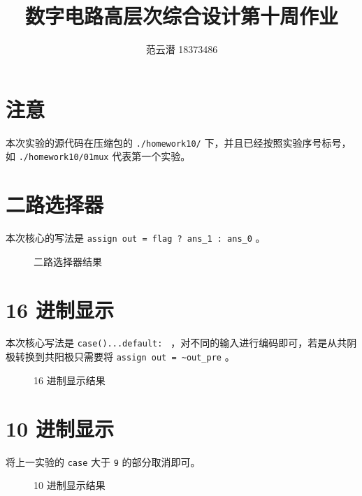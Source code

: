 \documentclass[lang=cn,11pt,a4paper,cite=authoryear]{elegantpaper}
\title{数字电路高层次综合设计\quad 第十周作业}
\author{范云潜 18373486}
\institute{微电子学院 184111 班}
\date{\zhtoday}
\begin{document}
\maketitle

\tableofcontents

\listoffigures

\section*{注意}

本次实验的源代码在压缩包的 \lstinline{./homework10/} 下，并且已经按照实验序号标号，如 \lstinline{./homework10/01mux} 代表第一个实验。

\section{二路选择器}

本次核心的写法是 \lstinline{assign out = flag ? ans_1 : ans_0} 。


\begin{figure}
    \centering
    \caption{二路选择器结果}\label{01} 
     \hfill 
\end{figure}

\section{16 进制显示}

本次核心写法是 \lstinline{case()...default: } ，对不同的输入进行编码即可，若是从共阴极转换到共阳极只需要将 \lstinline{assign out = ~out_pre} 。


\begin{figure}
    \centering
    \caption{16 进制显示结果}\label{02} 
     \hfill 
     \hfill 
     \hfill 
\end{figure}

\section{10 进制显示}

将上一实验的 \lstinline{case} 大于 \lstinline{9} 的部分取消即可。

\begin{figure}
    \centering
    \caption{10 进制显示结果}\label{03} 
     \hfill 
     \hfill 
\end{figure}
\end{document}
